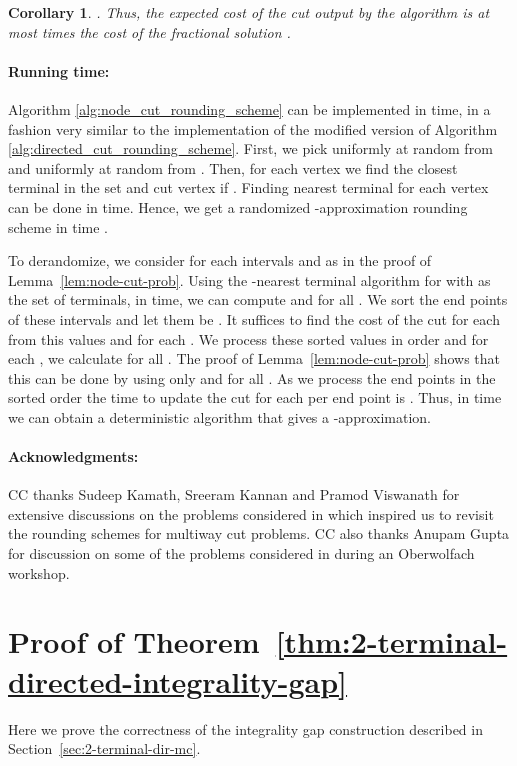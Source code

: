 \documentclass[11pt]{article}
\newtheorem{corollary}[lemma]{Corollary}
\begin{document}
\begin{corollary}
  .
  Thus, the expected cost of the cut output by the algorithm is at most
   times the cost of the fractional solution .
\end{corollary}

\paragraph{Running time:} 
Algorithm \ref{alg:node_cut_rounding_scheme} can be implemented in
 time, in a fashion very similar to the
implementation of the modified version of Algorithm
\ref{alg:directed_cut_rounding_scheme}. First, we pick 
uniformly at random from  and  uniformly at
random from . Then, for each vertex  we find the closest
terminal  in the set  and cut vertex  if
. Finding nearest terminal for each
vertex can be done in  time. Hence, we get a
randomized -approximation rounding scheme in time .

To derandomize, we consider for each  intervals  and
 as in the proof of Lemma~\ref{lem:node-cut-prob}. Using the
-nearest terminal algorithm for  with  as the set of
terminals, in  time, we can compute  and
 for all . We sort the  end points of these 
intervals and let them be .  It
suffices to find the cost of the cut for each  from this 
values and for each .  We process these
sorted values in order and for each , we calculate
 for all .  The proof of
Lemma~\ref{lem:node-cut-prob} shows that this can be done by using
only  and  for all .  As we process the end points
in the sorted order the time to update the cut for each  per end
point is .  Thus, in  time we can obtain a
deterministic algorithm that gives a -approximation.

\paragraph{Acknowledgments:} CC thanks Sudeep Kamath, Sreeram Kannan and
Pramod Viswanath for extensive discussions on the problems considered
in \cite{KKCV15} which inspired us to revisit the rounding schemes
for multiway cut problems. CC also thanks Anupam Gupta
for discussion on some of the problems considered in \cite{KKCV15} during
an Oberwolfach workshop. 




\appendix
\section{Proof of Theorem~\ref{thm:2-terminal-directed-integrality-gap}}
Here we prove the correctness of the integrality gap construction
described in Section~\ref{sec:2-terminal-dir-mc}.
\end{document}
